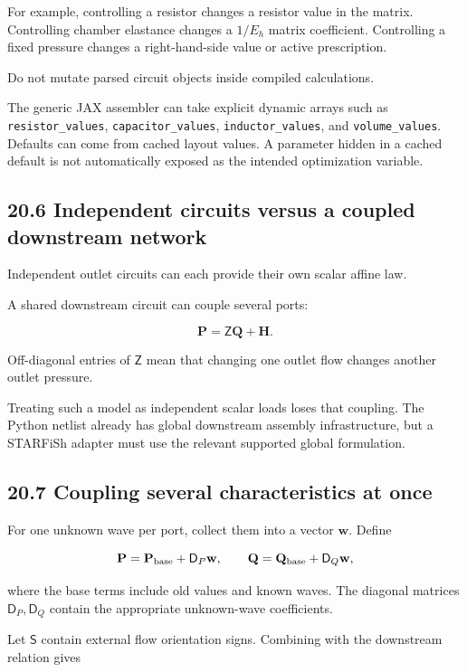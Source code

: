 \documentclass[11pt,a4paper]{article}
\begin{document}
For example, controlling a resistor changes a resistor value in the matrix. Controlling chamber elastance changes a \(1/E_h\) matrix coefficient. Controlling a fixed pressure changes a right-hand-side value or active prescription.

Do not mutate parsed circuit objects inside compiled calculations.

The generic JAX assembler can take explicit dynamic arrays such as \texttt{resistor\_\allowbreak{}values}, \texttt{capacitor\_\allowbreak{}values}, \texttt{inductor\_\allowbreak{}values}, and \texttt{volume\_\allowbreak{}values}. Defaults can come from cached layout values. A parameter hidden in a cached default is not automatically exposed as the intended optimization variable.

\subsection{20.6 Independent circuits versus a coupled downstream network}
Independent outlet circuits can each provide their own scalar affine law.

A shared downstream circuit can couple several ports:


\begingroup\small
\[
\mathbf P=\mathsf Z\mathbf Q+\mathbf H.
\]
\endgroup


Off-diagonal entries of \(\mathsf Z\) mean that changing one outlet flow changes another outlet pressure.

Treating such a model as independent scalar loads loses that coupling. The Python netlist already has global downstream assembly infrastructure, but a STARFiSh adapter must use the relevant supported global formulation.

\subsection{20.7 Coupling several characteristics at once}
For one unknown wave per port, collect them into a vector \(\mathbf w\). Define


\begingroup\small
\[
\mathbf P=\mathbf P_{\rm base}+\mathsf D_P\mathbf w,
\qquad
\mathbf Q=\mathbf Q_{\rm base}+\mathsf D_Q\mathbf w,
\]
\endgroup


where the base terms include old values and known waves. The diagonal matrices \(\mathsf D_P,\mathsf D_Q\) contain the appropriate unknown-wave coefficients.

Let \(\mathsf S\) contain external flow orientation signs. Combining with the downstream relation gives
\end{document}
